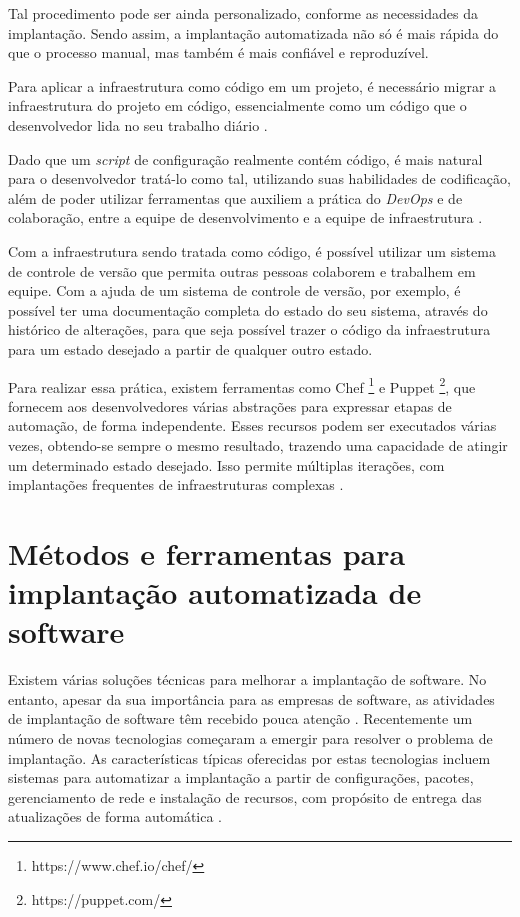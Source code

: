 Tal procedimento pode ser
ainda personalizado, conforme as necessidades da implantação. Sendo assim, a implantação
automatizada não só é mais rápida do que o processo manual, mas também é mais
confiável e reproduzível.

Para aplicar a infraestrutura como código em um projeto, é necessário
migrar a infraestrutura do projeto em código, essencialmente como um
código que o desenvolvedor lida no seu trabalho diário \cite{byhand}.

Dado que um \textit{script} de configuração realmente contém código, é mais natural
para o desenvolvedor tratá-lo como tal, utilizando suas habilidades de codificação,
além de poder utilizar ferramentas que auxiliem a prática do \textit{DevOps} e de colaboração,
entre a equipe de desenvolvimento e a equipe de infraestrutura \cite{byhand}. 

Com a infraestrutura sendo tratada como código, é possível utilizar um
sistema de controle de versão que permita outras pessoas colaborem e trabalhem em
equipe. Com a ajuda de um sistema de controle de versão, por exemplo, é possível 
ter uma documentação completa do estado do seu sistema, 
através do histórico de alterações, para que seja possível
trazer o código da infraestrutura para um estado desejado a partir de
qualquer outro estado.

Para realizar essa prática, existem ferramentas como Chef \footnote{https://www.chef.io/chef/} e 
Puppet \footnote{https://puppet.com/}, que
fornecem aos desenvolvedores várias abstrações para 
expressar etapas de automação,
de forma independente. Esses recursos podem ser executados várias vezes,
obtendo-se sempre o mesmo resultado, trazendo uma capacidade de atingir um determinado
estado desejado. Isso permite múltiplas iterações, 
com implantações frequentes de infraestruturas complexas
\cite{Hummer2013}.

\section{Métodos e ferramentas para implantação automatizada de software}
\label{subsec:metodoseferramentas}

Existem várias soluções técnicas para melhorar a implantação de software. No 
entanto, apesar da sua importância para as empresas de software, as atividades
de implantação de software têm recebido pouca atenção \cite{5741269}. Recentemente 
um número de novas tecnologias começaram a emergir para
resolver o problema de implantação. As características típicas oferecidas por
estas tecnologias incluem sistemas para automatizar a implantação a partir de
configurações, pacotes, gerenciamento de rede e instalação de recursos, com
propósito de entrega das atualizações de forma automática \cite{deployment1998}.

